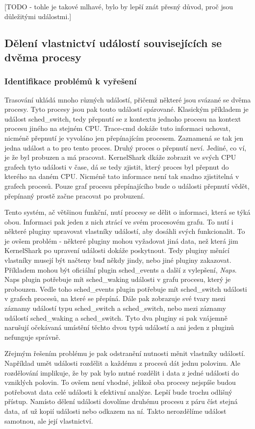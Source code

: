 [TODO - tohle je takové mlhavé, bylo by lepší znát přesný důvod, proč jsou důležitými událostmi.]

\subsection{Dělení vlastnictví událostí souvisejících se dvěma procesy}

\subsubsection*{Identifikace problémů k vyřešení}
Trasování ukládá mnoho různých událostí, přičemž některé jsou svázané se dvěma procesy. Tyto procesy jsou pak touto událostí spárované. Klasickým příkladem je událost sched\_switch, tedy přepnutí se z kontextu jednoho procesu na kontext procesu jiného na stejném CPU. Trace-cmd dokáže tuto informaci uchovat, nicméně přepnutí je vyvoláno jen přepínajícím procesem. Zaznamená se tak jen jedna událost a to pro tento proces. Druhý proces o přepnutí neví. Jediné, co ví, je že byl probuzen a má pracovat. KernelShark dkáže zobrazit ve svých CPU grafech tyto události v čase, dá se tedy zjistit, který proces byl přepnut do kterého na daném CPU. Nicméně tato informace není tak snadno zjistitelná v grafech procesů. Pouze graf procesu přepínajícího bude o události přepnutí vědět, přepínaný prostě začne pracovat po probuzení.

Tento systém, ač většinou funkční, nutí procesy se dělit o informaci, která se týká obou. Informaci pak jeden z nich ztrácí ve svém procesovém grafu. To nutí i některé pluginy upravovat vlastníky událostí, aby dosáhli svých funkcionalit. To je ovšem problém - některé pluginy mohou vyžadovat jiná data, než která jim KernelShark po upravení události dokáže poskytnout. Tedy pluginy měnící vlastníky musejí být načteny buď někdy jindy, nebo jiné pluginy zakazovat. Příkladem mohou být oficiální plugin sched\_events a další z vylepšení, \emph{Naps}. Naps plugin potřebuje mít sched\_waking události v grafu procesu, který je probouzen. Vedle toho sched\_events plugin potřebuje mít sched\_switch události v grafech procesů, na které se přepíná. Dále pak zobrazuje své tvary mezi záznamy událostí typu sched\_switch a sched\_switch, nebo mezi záznamy událostí sched\_waking a sched\_switch. Tyto dva pluginy si pak vzájemně narušují očekávaná umístění těchto dvou typů událostí a ani jeden z pluginů nefunguje správně.

Zřejmým řešením problému je pak odstranění nutnosti měnit vlastníky událostí. Například umět události rozdělit a každému z procesů dát jednu polovinu. Ale rozdělování implikuje, že by pak bylo nutné rozdělit i data z jedné události do vzniklých polovin. To ovšem není vhodné, jelikož oba procesy nejspíše budou potřebovat data celé události k efektivní analýze. Lepší bude trochu odlišný přístup. Namísto dělení události dovolíme druhému procesu z páru číst stejná data, ať už kopií události nebo odkazem na ní. Takto nerozdělíme událost samotnou, ale její vlastnictví.

